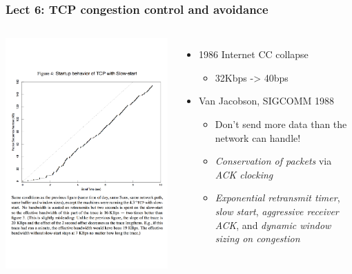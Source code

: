 \begin{frame}
  \frametitle{Lect 6: TCP congestion control and avoidance}

  \begin{columns}[T]
      \begin{center}
	\includegraphics[width=1.2\textwidth]{../../figures/vj-congestion-slow-start.pdf}
      \end{center}


      \begin{itemize}
	\item 1986 Internet CC collapse
	\begin{itemize}
	  \item 32Kbps -> 40bps
	\end{itemize}

	\item Van Jacobson, SIGCOMM 1988
	\begin{itemize}
	  \item Don't send more data than the network can handle!
	  \item \textit{Conservation of packets} via \textit{ACK clocking}
	  \item \textit{Exponential retransmit timer}, \textit{slow start},
	    \textit{aggressive receiver ACK}, and \textit{dynamic window
	    sizing on congestion}
        \end{itemize}


\end{itemize}
\end{columns}
\end{frame}
